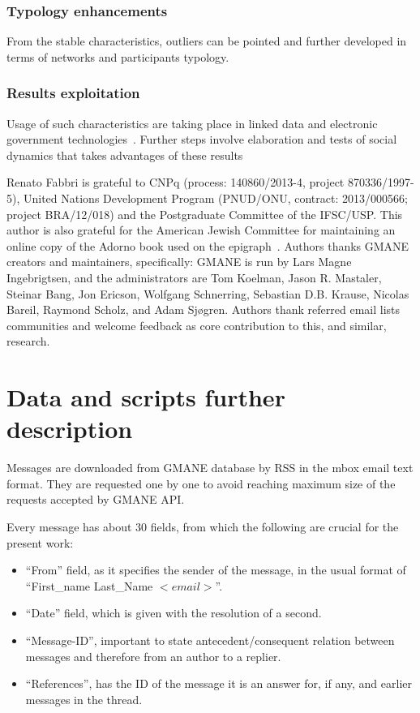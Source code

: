 \documentclass[%
 aip,
 jmp,%
 amsmath,amssymb,
 reprint,%
]{revtex4-1}
\begin{document}
        \subsubsection{Typology enhancements}
From the stable characteristics, outliers can be pointed and further developed in terms of networks and participants typology.

        \subsubsection{Results exploitation}
Usage of such characteristics are taking place in linked data and electronic government technologies~\cite{ops,opa}. Further steps involve elaboration and tests of social dynamics that takes advantages of these results

\begin{acknowledgments}
Renato Fabbri is grateful to CNPq (process: 140860/2013-4,
project 870336/1997-5), United Nations Development Program (PNUD/ONU, contract: 2013/000566; project BRA/12/018)  and 
the Postgraduate Committee of the IFSC/USP. This author is also grateful for
the American Jewish Committee for maintaining an online copy of the Adorno book
used on the epigraph~\cite{adorno}. Authors thanks GMANE creators and maintainers, specifically: GMANE is run by Lars Magne Ingebrigtsen, and the administrators are Tom Koelman, Jason R. Mastaler, Steinar Bang, Jon Ericson, Wolfgang Schnerring, Sebastian D.B. Krause, Nicolas Bareil, Raymond Scholz, and Adam Sjøgren. Authors thank referred email lists communities and welcome feedback as core contribution to this, and similar, research.
\end{acknowledgments}


\appendix
\section{Data and scripts further description}\label{scripts}
Messages are downloaded from GMANE database by RSS in the mbox email text format. 
They are requested one by one to avoid reaching maximum size of the requests accepted by
GMANE API. 

Every message has about 30 fields, from which the following are crucial
for the present work:
\begin{itemize}
    \item ``From'' field, as it specifies the sender of the message, in the usual format of ``First\_name Last\_Name $<email>$''.
    \item ``Date'' field, which is given with the resolution of a second.
    \item ``Message-ID'', important to state antecedent/consequent relation between messages and therefore from an author to a replier.
    \item ``References'', has the ID of the message it is an answer for, if any, and earlier messages in the thread.
\end{itemize}
\end{document}
